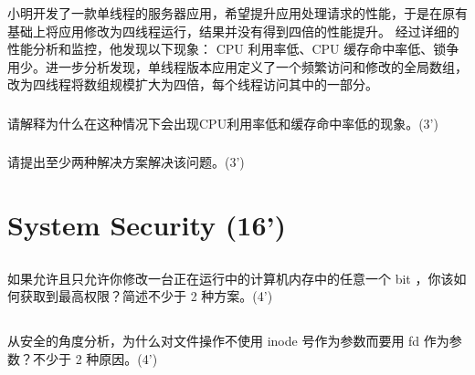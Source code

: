 \documentclass[a4paper,12pt]{article}
\newcommand{\score}[1]{(#1')}
\begin{document}
小明开发了一款单线程的服务器应用，希望提升应用处理请求的性能，于是在原有基础上将应用修改为四线程运行，结果并没有得到四倍的性能提升。
经过详细的性能分析和监控，他发现以下现象： CPU 利用率低、CPU 缓存命中率低、锁争用少。进一步分析发现，单线程版本应用定义了一个频繁访问和修改的全局数组，改为四线程将数组规模扩大为四倍，每个线程访问其中的一部分。

\subsubsection{}

请解释为什么在这种情况下会出现CPU利用率低和缓存命中率低的现象。\score{3}

\begin{answer}
  \lipsum[3]
\end{answer}

\subsubsection{}

请提出至少两种解决方案解决该问题。\score{3}

\begin{answer}
  \lipsum[3]
\end{answer}

\section{System Security \score{16}}

\subsection{}

如果允许且只允许你修改一台正在运行中的计算机内存中的任意一个 bit ，你该如何获取到最高权限？简述不少于 2 种方案。\score{4}

\begin{answer}
  \lipsum[3]
\end{answer}

\subsection{}

从安全的角度分析，为什么对文件操作不使用 inode 号作为参数而要用 fd 作为参数？不少于 2 种原因。\score{4}

\begin{answer}
  \lipsum[3]
\end{answer}
\end{document}
